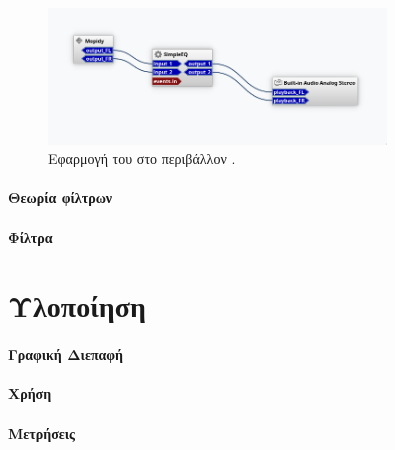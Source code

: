 \documentclass[review]{article}
\begin{document}
\begin{figure}[htpb]
    \centering
    \includegraphics[width=0.8\textwidth]{./assets/Carla_Basic.png}
    \caption{Εφαρμογή του  στο περιβάλλον .}
    \label{fig:carla_basic}
\end{figure}

\paragraph{Θεωρία  φίλτρων}
\paragraph{Φίλτρα } 

\section{Υλοποίηση}

\paragraph{Γραφική Διεπαφή}
\paragraph{Χρήση}
\paragraph{Μετρήσεις}

\cite{Dirac1953888}


\end{document}
